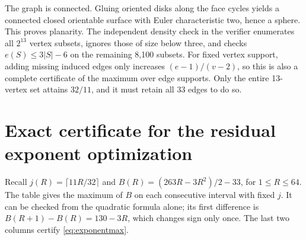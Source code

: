 \documentclass[11pt]{article}
\theoremstyle{definition}
\theoremstyle{remark}
\newcommand{\1}{\mathbf 1}
\begin{document}
The graph is connected. Gluing oriented disks along the face cycles yields a
connected closed orientable surface with Euler characteristic two, hence a
sphere. This proves planarity. The independent density check in the verifier
enumerates all $2^{13}$ vertex subsets, ignores those of size below three, and
checks $e(S)\le3|S|-6$ on the remaining 8,100 subsets. For fixed vertex support,
adding missing induced edges only increases $(e-1)/(v-2)$, so this is also a
complete certificate of the maximum over edge supports. Only the entire
13-vertex set attains $32/11$, and it must retain all 33 edges to do so.

\section{Exact certificate for the residual exponent optimization}
\label{app:exponents}

Recall $j(R)=\lceil11R/32\rceil$ and
$B(R)=(263R-3R^2)/2-33$, for $1\le R\le64$.
The table gives the maximum of $B$ on each consecutive interval with fixed
$j$. It can be checked from the quadratic formula alone; its first difference
is $B(R+1)-B(R)=130-3R$, which changes sign only once.
The last two columns certify \eqref{eq:exponentmax}.
\end{document}
